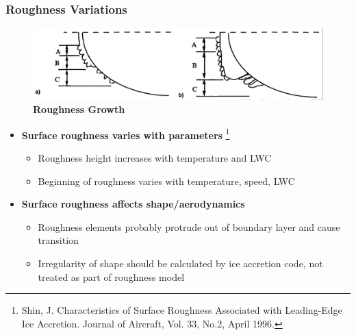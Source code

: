 \documentclass[9pt]{beamer}
\begin{document}
\begin{frame}
\frametitle{Roughness Variations}
\label{sec-5-4}

\begin{figure}
  \centering
  \includegraphics[width=1\textwidth]{IcingRoughness.png} \\
  {\bf Roughness Growth}
\end{figure}

\begin{itemize}
\item \textbf{Surface roughness varies with parameters} \footnote{Shin, J. Characteristics of Surface Roughness Associated
with Leading-Edge Ice Accretion. Journal of Aircraft, Vol. 33, No.2,
April 1996.
 }
\begin{itemize}
\item Roughness height increases with temperature and LWC
\item Beginning of roughness varies with temperature, speed, LWC
\end{itemize}
\item \textbf{Surface roughness affects shape/aerodynamics} \footnotemark[12]
\begin{itemize}
\item Roughness elements probably protrude out of boundary layer and cause transition
\item Irregularity of shape should be calculated by ice accretion code, not treated as part of roughness model
\end{itemize}
\end{itemize}
\end{frame}
\end{document}
